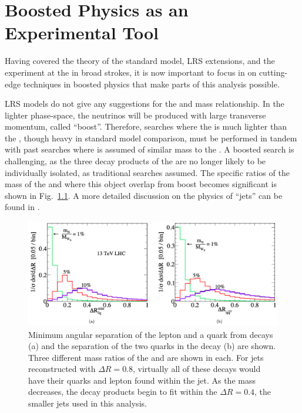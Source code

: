 \chapter{Boosted Physics as an Experimental Tool}
\label{ch:boost}
\label{sec:RNjets}
Having covered the theory of the standard model, LRS extensions, and the \CMS experiment at the \LHC in broad strokes, it is now important to focus in on cutting-edge techniques in boosted physics that make parts of this analysis possible. 

LRS models do not give any suggestions for the \NR and \WR mass relationship. In the lighter \NR phase-space, the neutrinos will be produced with large transverse momentum, called ``boost''. Therefore, searches where the \NR is much lighter than the \WR, though heavy in standard model comparison, must be performed in tandem with past searches where \NR is assumed of similar mass to the \WR. A boosted \NR search is challenging, as the three decay products of the \NR are no longer likely to be individually isolated, as traditional \WR searches assumed. The specific ratios of the mass of the \WR and \NR where this object overlap from boost becomes significant is shown in Fig.~\ref{fig:NRjet}. A more detailed discussion on the physics of \NR ``jets'' can be found in \cite{nrjets}.
\begin{figure}[!tp]
    \centering
    \includegraphics[width=\textwidth]{figures/nrjet_paper_plot.png}
    \caption[
        Angular separation of boosted \NR decay products
    ]    
    {
        Minimum angular separation of the lepton and a quark from \NR decays (a) and the separation of the two quarks in the \NR decay (b) are shown. Three different mass ratios of the \NR and \WR are shown in each. For jets reconstructed with $\Delta R = 0.8$, virtually all of these \NR decays would have their quarks and lepton found within the jet\cite{nrjets}. As the \NR mass decreases, the decay products begin to fit within the $\Delta R = 0.4$, the smaller jets used in this analysis.
    }
    \label{fig:NRjet}

\end{figure}

